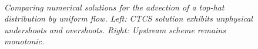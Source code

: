 \begin{figure}
	\mbox{
		}
	\caption{\textsl{Comparing numerical solutions for the advection of a top-hat distribution by uniform flow. Left: CTCS solution exhibits unphysical undershoots and overshoots. Right: Upstream scheme remains monotonic.}}
	\label{fig:ctcs}
\end{figure}
